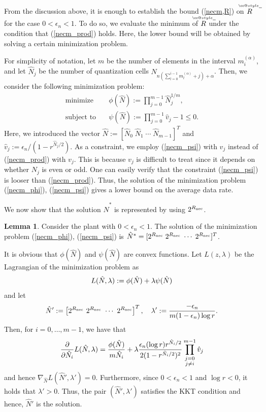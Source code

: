 \documentclass[a4paper, 11pt]{article}
\makeatletter
\def\widebar{\accentset{{\cc@style\underline{\mskip10mu}}}}
\newcommand{\Rnec}{R_{\textnormal{nec}}}
\newcommand{\hN}{\hat N}
\theoremstyle{definition}
\newtheorem{lem}{Lemma}
\newenvironment{pf}[1][\proofname]{\par\pushQED{\qed}
 \normalfont\topsep6\p@\@plus6\p@\relax\trivlist\item[\hskip\labelsep\bfseries#1\@addpunct{.}]
 \ignorespaces}{\popQED\endtrivlist\@endpefalse}
\makeatother
\begin{document}
From the discussion above, it is enough to establish the bound (\ref{necm,R})
on $\widebar R$ for the case $0<\epsilon_n<1$.
To do so, we evaluate the minimum of $\widebar R$ under the condition that
(\ref{necm_prod}) holds.
Here, the lower bound will be obtained by solving a certain minimization
problem.

For simplicity of notation, let $m$ be the number of elements in the interval
$m^{(\alpha)}_{i}$, and let $\hN_j$ be the number of quantization cells
$N_{n(\sum_{l=0}^{i-1}m^{(\alpha)}_{l}+j)+\alpha}$.
Then, we consider the following minimization problem:
\begin{align}
 \text{minimize}\quad &\phi(\hN):=\prod_{j=0}^{m-1} \hN_j^{1/m},\label{necm_phi}\\
 \text{subject to}\quad &\psi(\hN):=\prod_{j=0}^{m-1}\hat v_j-1\leq0.\label{necm_psi}
\end{align}
Here, we introduced the vector $\hN:=[\hN_0 \; \hN_1\; \cdots \; \hN_{m-1}]^T$ and
$\hat v_j:= {\epsilon_n}/(1-r^{\hN_j/2})$.
As a constraint, we employ (\ref{necm_psi}) with $\hat v_j$ instead of
(\ref{necm_prod}) with $v_j$.
This is because $v_j$ is difficult to treat since it depends on whether
$N_j$ is even or odd.
One can easily verify that the constraint (\ref{necm_psi}) is looser than
(\ref{necm_prod}).
Thus, the solution of the minimization problem (\ref{necm_phi}), (\ref{necm_psi})
gives a lower bound on the average data rate.

We now show that the solution $\hN^*$ is represented by using $2^{\Rnec}$.
\begin{lem}\label{lem,opt_solution}
 Consider the plant with $0<\epsilon_n<1$.
 The solution of the minimization problem (\ref{necm_phi}), (\ref{necm_psi})
is $\hN^*=[2^{\Rnec}\; 2^{\Rnec}\; \cdots \; 2^{\Rnec}]^T$.
\end{lem}

\begin{pf}
 It is obvious that $\phi(\hN)$ and $\psi(\hN)$ are convex functions.
Let $L(z,\lambda)$ be the Lagrangian of the minimization problem as
\begin{align}
 L(\hN,\lambda):=\phi(\hN)+\lambda\psi(\hN)\notag
\end{align}
and let
\begin{align}
 \hN':=\left[2^{\Rnec}\ 2^{\Rnec}\ \cdots\ 2^{\Rnec}\right]^T,\quad
 \lambda':=\frac{-\epsilon_n}{m(1-\epsilon_n)\log r}.\notag
\end{align}
Then, for $i=0,\dots,m-1$, we have that
\begin{align}
 \frac{\partial}{\partial \hN_i}L(\hN,\lambda)
 =\frac{\phi(\hN)}{m\hN_i}+\lambda\frac{\epsilon_n(\log r)r^{\hN_i/2}}{2(1-r^{\hN_i/2})^2}
 \prod_{\substack{j=0\\ j\neq i}}^{m-1}\hat v_j\notag
\end{align}
and hence $\nabla_{\!\hN}L(\hN',\lambda')=0$.
Furthermore, since $0<\epsilon_n<1$ and $\log r<0$, it holds that $\lambda'>0$.
Thus, the pair $(\hN',\lambda')$ satisfies the KKT condition \cite{Luenberger1997}
and hence, $\hN'$ is the solution.
\end{pf}
\end{document}
